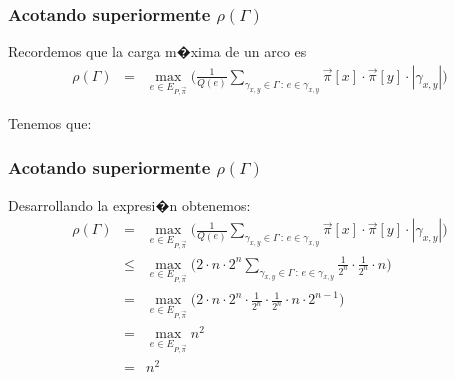 \documentclass{beamer}
\newcommand{\vs}[1]{\vspace{#1mm}}
\begin{document}
	\begin{frame}
		\frametitle{Acotando superiormente $\rho(\Gamma)$}
		
		{\footnotesize
			Recordemos que la carga m�xima de un arco es
			\begin{eqnarray*}
				\rho(\Gamma) & = & \max_{e \in E_{P,\vec \pi}} \bigg(\frac{1}{Q(e)} \sum_{\gamma_{x,y} \in \Gamma \,:\, e \in \gamma_{x,y}} \vec \pi[x] \cdot \vec \pi[y] \cdot |\gamma_{x,y}|\bigg)
			\end{eqnarray*}
			
			\vs{8}
			
			Tenemos que:
			\begin{itemize}
			\end{itemize}
		}
	\end{frame}
	
	\begin{frame}
		\frametitle{Acotando superiormente $\rho(\Gamma)$}
		
		{\small
			Desarrollando la expresi�n obtenemos:
			\begin{eqnarray*}
				\rho(\Gamma) & = & \max_{e \in E_{P,\vec \pi}} \bigg(\frac{1}{Q(e)} \sum_{\gamma_{x,y} \in \Gamma \,:\, e \in \gamma_{x,y}} \vec \pi[x] \cdot \vec \pi[y] \cdot |\gamma_{x,y}|\bigg)\\
				& \leq &  \max_{e \in E_{P,\vec \pi}} \bigg(2 \cdot n \cdot 2^n \sum_{\gamma_{x,y} \in \Gamma \,:\, e \in \gamma_{x,y}} \frac{1}{2^n} \cdot \frac{1}{2^n} \cdot n\bigg)\\
				& = &  \max_{e \in E_{P,\vec \pi}} \bigg(2 \cdot n \cdot 2^n \cdot \frac{1}{2^n} \cdot \frac{1}{2^n} \cdot n \cdot 2^{n-1} \bigg)\\
				& = &  \max_{e \in E_{P,\vec \pi}} n^2\\
				& = & n^2
			\end{eqnarray*}
		}
	\end{frame}
	
\end{document}
